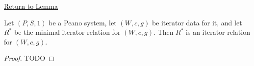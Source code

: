 \newpage
{}
\label{prf:iterator-relation-consistency}

\begin{remark*}[Return]
\hyperref[lem:iterator-relation-consistency]{Return to Lemma}
\end{remark*}

\begin{theorem*}
Let $(P,S,1)$ be a Peano system, let $(W,c,g)$ be iterator data for it, and let
$R^*$ be the minimal iterator relation for $(W,c,g)$. Then $R^*$ is an
iterator relation for $(W,c,g)$.
\end{theorem*}

\begin{proof}
TODO
\end{proof}
